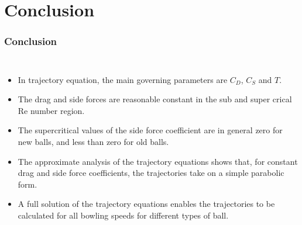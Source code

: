 \documentclass{beamer}
\begin{document}
\section{Conclusion}
\begin{frame}
\frametitle{Conclusion}
\begin{columns}
  \begin{itemize}
  \item In trajectory equation, the main governing parameters are $C_D$, $C_S$ and $T$.
  \item The drag and side forces are reasonable constant in the sub and super crical Re number region.
  \item The supercritical values of the side force coefficient are in general zero for new balls, and less than zero for old balls.
  \item The approximate analysis of the trajectory equations shows that, for constant drag and side force coefficients, the trajectories take on a simple parabolic form.
  \item A full solution of the trajectory equations enables the trajectories to be calculated for all bowling speeds for different types of ball.
  \end{itemize}
\end{columns}

\end{frame}

%
%
\end{document}
